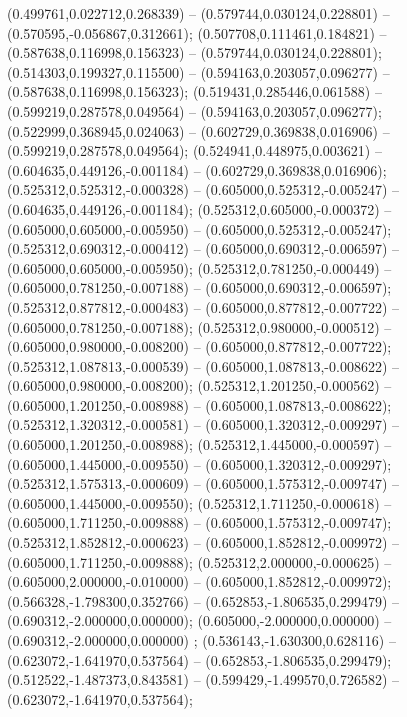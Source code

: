  (0.499761,0.022712,0.268339) -- (0.579744,0.030124,0.228801) -- (0.570595,-0.056867,0.312661);
 (0.507708,0.111461,0.184821) -- (0.587638,0.116998,0.156323) -- (0.579744,0.030124,0.228801);
 (0.514303,0.199327,0.115500) -- (0.594163,0.203057,0.096277) -- (0.587638,0.116998,0.156323);
 (0.519431,0.285446,0.061588) -- (0.599219,0.287578,0.049564) -- (0.594163,0.203057,0.096277);
 (0.522999,0.368945,0.024063) -- (0.602729,0.369838,0.016906) -- (0.599219,0.287578,0.049564);
 (0.524941,0.448975,0.003621) -- (0.604635,0.449126,-0.001184) -- (0.602729,0.369838,0.016906);
 (0.525312,0.525312,-0.000328) -- (0.605000,0.525312,-0.005247) -- (0.604635,0.449126,-0.001184);
 (0.525312,0.605000,-0.000372) -- (0.605000,0.605000,-0.005950) -- (0.605000,0.525312,-0.005247);
 (0.525312,0.690312,-0.000412) -- (0.605000,0.690312,-0.006597) -- (0.605000,0.605000,-0.005950);
 (0.525312,0.781250,-0.000449) -- (0.605000,0.781250,-0.007188) -- (0.605000,0.690312,-0.006597);
 (0.525312,0.877812,-0.000483) -- (0.605000,0.877812,-0.007722) -- (0.605000,0.781250,-0.007188);
 (0.525312,0.980000,-0.000512) -- (0.605000,0.980000,-0.008200) -- (0.605000,0.877812,-0.007722);
 (0.525312,1.087813,-0.000539) -- (0.605000,1.087813,-0.008622) -- (0.605000,0.980000,-0.008200);
 (0.525312,1.201250,-0.000562) -- (0.605000,1.201250,-0.008988) -- (0.605000,1.087813,-0.008622);
 (0.525312,1.320312,-0.000581) -- (0.605000,1.320312,-0.009297) -- (0.605000,1.201250,-0.008988);
 (0.525312,1.445000,-0.000597) -- (0.605000,1.445000,-0.009550) -- (0.605000,1.320312,-0.009297);
 (0.525312,1.575313,-0.000609) -- (0.605000,1.575312,-0.009747) -- (0.605000,1.445000,-0.009550);
 (0.525312,1.711250,-0.000618) -- (0.605000,1.711250,-0.009888) -- (0.605000,1.575312,-0.009747);
 (0.525312,1.852812,-0.000623) -- (0.605000,1.852812,-0.009972) -- (0.605000,1.711250,-0.009888);
 (0.525312,2.000000,-0.000625) -- (0.605000,2.000000,-0.010000) -- (0.605000,1.852812,-0.009972);
 (0.566328,-1.798300,0.352766) -- (0.652853,-1.806535,0.299479) -- (0.690312,-2.000000,0.000000);
 (0.605000,-2.000000,0.000000) -- (0.690312,-2.000000,0.000000) ;
 (0.536143,-1.630300,0.628116) -- (0.623072,-1.641970,0.537564) -- (0.652853,-1.806535,0.299479);
 (0.512522,-1.487373,0.843581) -- (0.599429,-1.499570,0.726582) -- (0.623072,-1.641970,0.537564);
